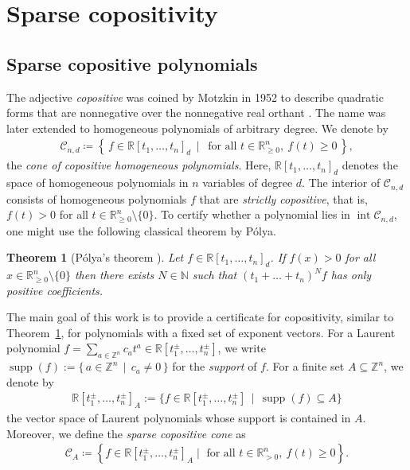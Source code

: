 \documentclass[a4paper,11pt]{amsart}
\newtheorem{theorem}{Theorem}[section]
\theoremstyle{definition}
\DeclareMathOperator{\interior}{int}
\DeclareMathOperator{\supp}{supp}
\newcommand{\RR}{\mathbb{R}}
\begin{document}
\section{Sparse copositivity}
\label{Sec:Background}
\subsection{Sparse copositive polynomials}
The adjective \emph{copositive} was coined by Motzkin in 1952 to describe quadratic forms that are nonnegative over the nonnegative real orthant \cite{Motzkin}.
The name was later extended to homogeneous polynomials of arbitrary degree. 
We denote by
\begin{align}
    \label{Eq:DefCnd}
 \mathcal{C}_{n,d} \coloneqq \left\{\, f \in \mathbb{R}[t_1, \dots , t_n]_d \, \mid \,  \text{ for all } t \in \mathbb{R}^n_{\geq0}, \ f(t) \geq 0 \,\right\},
\end{align}
the \emph{cone of copositive homogeneous polynomials}. Here, $\RR[t_1, \dots , t_n]_d$ denotes the space of homogeneous polynomials in $n$ variables of degree $d$.
The interior of $\mathcal{C}_{n,d}$ consists of homogeneous polynomials $f$ that are \emph{strictly copositive}, that is, $f(t) > 0$ for all $t \in \mathbb{R}^n_{\geq0} \setminus \{ 0\}$.
To certify whether a polynomial lies in $\interior \mathcal{C}_{n,d}$, one might use the following classical theorem by Pólya.
\begin{theorem}[Pólya's theorem \cite{Polya}]
\label{Thm:ClassicalPolya}
    Let $f \in \mathbb{R}[t_1, \dots , t_n]_d$.
    If $f(x) > 0$ for all $x \in \mathbb{R}^n_{\geq0} \setminus \{ 0\}$
    then there exists $N \in \mathbb{N}$ such that $(t_1 + \dots + t_n)^Nf$ has only positive coefficients.
\end{theorem}
The main goal of this work is to provide a certificate for copositivity, similar to Theorem~\ref{Thm:ClassicalPolya}, for polynomials with a fixed set of exponent vectors.
For a Laurent polynomial $f = \sum_{a \in \mathbb{Z}^n} c_a t^a \in \mathbb{R}[t_1^\pm, \dots, t_n^\pm]$, we write $\supp(f) := \{ \, a \in \mathbb{Z}^n \, \mid \, c_a \neq 0 \, \}$ for the \emph{support} of $f$.
For a finite set $A \subseteq \mathbb{Z}^n$, we denote by
\begin{align}
    \RR[t_1^\pm,\ldots,t_n^\pm]_A := \big\{ f  \in \mathbb{R}[t_1^\pm,\dots,t_n^\pm] \, \mid \, \supp(f) \subseteq A \big\}
\end{align}
the vector space of Laurent polynomials whose support is contained in $A$. 
Moreover, we  define the \emph{sparse copositive cone} as
\begin{align}
\label{Eq:DefSparseCoposCone}
\mathcal{C}_A \coloneqq \left\{ f \in \RR[t_1^\pm,\ldots,t_n^\pm]_A \mid \text{ for all } t \in \mathbb{R}^n_{>0},\ f(t) \geq 0 \right\}.    
\end{align}
\end{document}
